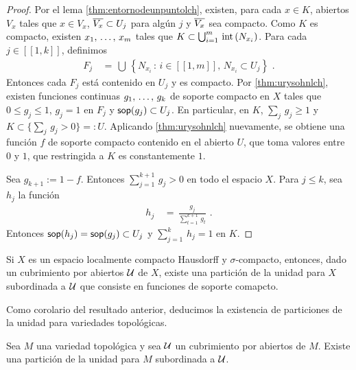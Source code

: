 \begin{proof}
	Por el lema \ref{thm:entornodeunpuntolch}, existen, para cada
	$x\in K$, abiertos $V_{x}$ tales que $x\in V_{x}$,
	$\clos{V_{x}}\subset U_{j}$ para alg\'{u}n $j$ y $\clos{V_{x}}$ sea
	compacto. Como $K$ es compacto, existen $\lista{x}{m}$ tales que
	$K\subset\bigcup_{i=1}^{m}\,\interior{N_{x_{i}}}$. Para cada
	$j\in[\![1,k]\!]$, definimos
	\begin{align*}
		F_{j} & \,=\,
			\bigcup\,\left\lbrace N_{x_{i}}\,:\,
			i\in[\![1,m]\!],\,N_{x_{i}}\subset U_{j}\right\rbrace
		\text{ .}
	\end{align*}
	Entonces cada $F_{j}$ est\'{a} contenido en $U_{j}$ y es compacto.
	Por \ref{thm:urysohnlch}, existen funciones continuas
	$\lista{g}{k}$ de soporte compacto en $X$ tales que
	$0\leq g_{j}\leq 1$, $g_{j}=1$ en $F_{j}$ y
	$\soporte{g_{j}}\subset U_{j}$. En particular, en $K$,
	$\sum_{j}\,g_{j}\geq 1$ y $K\subset\{\sum_{j}\,g_{j} >0\}=:U$.
	Aplicando \ref{thm:urysohnlch} nuevamente, se obtiene una funci\'{o}n
	$f$ de soporte compacto contenido en el abierto $U$, que toma valores
	entre $0$ y $1$, que restringida a $K$ es constantemente $1$.

	Sea $g_{k+1}:=1-f$. Entonces $\sum_{j=1}^{k+1}\,g_{j}>0$ en todo el
	espacio $X$. Para $j\leq k$, sea $h_{j}$ la funci\'{o}n
	\begin{align*}
		h_{j} & \,=\,\frac{g_{j}}{\sum_{t=1}^{k+1}\,g_{t}}
		\text{ .}
	\end{align*}
	Entonces $\soporte{h_{j}}=\soporte{g_{j}}\subset U_{j}$ y
	$\sum_{j=1}^{k}\,h_{j}=1$ en $K$.
\end{proof}

\begin{propoParticionesSigmaCompLCH}\label{thm:particionessigmacomplch}
	Si $X$ es un espacio localmente compacto Hausdorff y $\sigma$-compacto,
	entonces, dado un cubrimiento por abiertos $\cal{U}$ de $X$,
	existe una partici\'{o}n de la unidad para $X$ subordinada a
	$\cal{U}$ que consiste en funciones de soporte comapcto.
\end{propoParticionesSigmaCompLCH}

Como corolario del resultado anterior, deducimos la existencia de particiones
de la unidad para variedades topol\'{o}gicas.

\begin{coroParticionesVarTop}\label{thm:particionesvartop}
	Sea $M$ una variedad topol\'{o}gica y sea $\cal{U}$ un cubrimiento
	por abiertos de $M$. Existe una partici\'{o}n de la unidad
	para $M$ subordinada a $\cal{U}$.
\end{coroParticionesVarTop}

